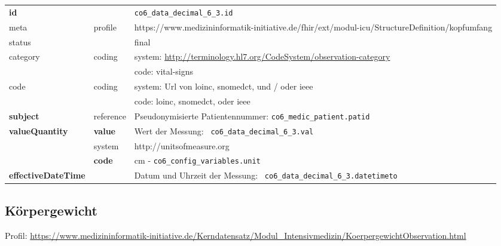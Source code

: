 \begin{longtable}{|l|l|p{7.5cm}|}
	\hline
	\rowcolor{lightgray} \multicolumn{3}{|l|}{Data Mapping (inhaltlich)} \\ \hline
	\textbf{id} &  & \texttt{co6\_data\_decimal\_6\_3.id} \\ \hline
	meta & profile & https://www.medizininformatik-initiative.de/fhir/ext/modul-icu/StructureDefinition/kopfumfang \\ \hline 
	status &  & final   \\ \hline 
	category & coding & system: \url{http://terminology.hl7.org/CodeSystem/observation-category} \\
	\cline{3-3}
	& & code: vital-signs \\ \hline
	code & coding & system: Url von \ac{loinc}, \ac{snomedct}, und / oder \ac{ieee} \\ 
	\cline{3-3} 
	&  & code: \ac{loinc}, \ac{snomedct}, oder \ac{ieee} \\ \hline
	\textbf{subject}  & reference & Pseudonymisierte Patientennummer: \texttt{co6\_medic\_patient.patid} \\ \hline
	\textbf{valueQuantity}  & \textbf{value} & Wert der Messung: \texttt{
		co6\_data\_decimal\_6\_3.val} \\
	\cline{2-3}
	& system & http://unitsofmeasure.org \\
	\cline{2-3}
	& \textbf{code} & cm - \texttt{co6\_config\_variables.unit} \\ \hline
	\textbf{effectiveDateTime}  & & Datum und Uhrzeit der Messung: \texttt{
		co6\_data\_decimal\_6\_3.datetimeto} \\ \hline
\end{longtable}

\subsection{Körpergewicht} 

Profil: \url{https://www.medizininformatik-initiative.de/Kerndatensatz/Modul_Intensivmedizin/KoerpergewichtObservation.html}

